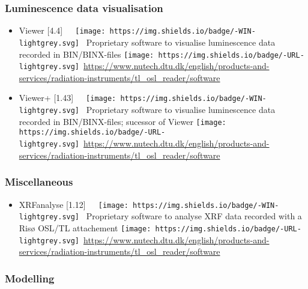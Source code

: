 \documentclass[]{article}
\providecommand{\tightlist}{%
  \setlength{\itemsep}{0pt}\setlength{\parskip}{0pt}}
\begin{document}
\hypertarget{luminescence-data-visualisation}{%
\subsubsection{Luminescence data visualisation}\label{luminescence-data-visualisation}}

\begin{itemize}
\tightlist
\item
  Viewer {[}4.4{]}~~~\texttt{[image: https://img.shields.io/badge/-WIN-lightgrey.svg]}~
  Proprietary software to visualise luminescence data recorded in BIN/BINX-files
  \texttt{[image: https://img.shields.io/badge/-URL-lightgrey.svg]}~\url{https://www.nutech.dtu.dk/english/products-and-services/radiation-instruments/tl_osl_reader/software}
  \emph{ }
\item
  Viewer+ {[}1.43{]}~~~\texttt{[image: https://img.shields.io/badge/-WIN-lightgrey.svg]}~
  Proprietary software to visualise luminescence data recorded in BIN/BINX-files; sucessor of Viewer
  \texttt{[image: https://img.shields.io/badge/-URL-lightgrey.svg]}~\url{https://www.nutech.dtu.dk/english/products-and-services/radiation-instruments/tl_osl_reader/software}
  \emph{ }
\end{itemize}

\hypertarget{miscellaneous}{%
\subsubsection{Miscellaneous}\label{miscellaneous}}

\begin{itemize}
\tightlist
\item
  XRFanalyse {[}1.12{]}~~~\texttt{[image: https://img.shields.io/badge/-WIN-lightgrey.svg]}~
  Proprietary software to analyse XRF data recorded with a Risø OSL/TL attachement
  \texttt{[image: https://img.shields.io/badge/-URL-lightgrey.svg]}~\url{https://www.nutech.dtu.dk/english/products-and-services/radiation-instruments/tl_osl_reader/software}
  \emph{ }
\end{itemize}

\hypertarget{modelling}{%
\subsubsection{Modelling}\label{modelling}}
\end{document}
